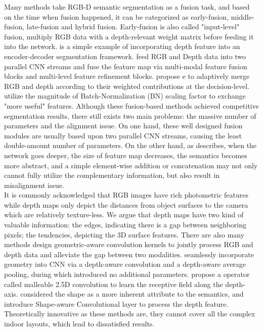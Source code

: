 \documentclass[journal]{IEEEtran}
\begin{document}
    Many methods take RGB-D semantic segmentation as a fusion task, and based on the time when fusion happened, it can be categorized as early-fusion, middle-fusion, late-fusion and hybrid fusion\cite{zhang2021deep}. Early-fusion is also called "input-level" fusion, \cite{cao2021rgbxd} multiply RGB data with a depth-relevant weight matrix before feeding it into the network.  \cite{2016fusenet} is a simple example of incorporating  depth feature into an encoder-decoder segmentation framework. \cite{park2017rdfnet} feed RGB and Depth data into two parallel CNN streams and fuse the feature map via multi-modal feature fusion blocks and multi-level feature refinement blocks. \cite{cheng2017locality} propose e to adaptively merge RGB and depth according to their weighted contributions at the decision-level. \cite{2020deep} utilize the magnitude of Batch-Normalization (BN) scaling factor to exchange "more useful" features. Although these fusion-based methods achieved competitive segmentation results, there still exists two main problems: the massive number of parameters and the alignment issue. On one hand, these well designed fusion modules are usually based upon two parallel CNN streams, causing the least double-amount number of parameters. On the other hand, as \cite{2021global} describes, when the network goes deeper, the size of feature map decreases, the semantics becomes more abstract, and a simple element-wise addition or concatenation may not only cannot fully utilize the complementary information, but also result in misalignment issue.\\   
 
    It is commonly acknowledged that RGB images have rich photometric features while depth maps only depict the distances from object surfaces to the camera which are relatively texture-less. We argue that depth maps have two kind of valuable information: the edges, indicating there is a gap between neighboring pixels; the tendencies, depicting the 3D surface features. There are also many methods design geometric-aware convolution kernels to jointly process RGB and depth data and alleviate the gap between two modalities. \cite{2018depthaware} seamlessly incorporate geometry into CNN via a depth-aware convolution and a depth-aware average pooling, during which introduced no additional parameters. \cite{2020malleable} propose a operator called malleable 2.5D convolution to learn the receptive field along the depth-axis. \cite{2021shapeconv} considered the shape as a more inherent attribute to the semantics, and introduce Shape-aware Convolutional layer to process the depth feature. Theoretically innovative as these methods are, they cannot cover all the complex indoor layouts, which lead to dissatisfied results. \\   
\end{document}
